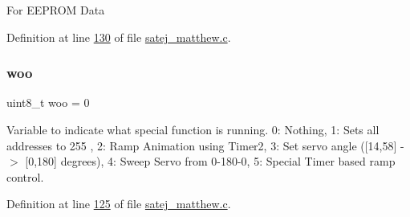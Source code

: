 For E\+E\+P\+R\+OM Data 

Definition at line \mbox{\hyperlink{satej__matthew_8c_source_l00130}{130}} of file \mbox{\hyperlink{satej__matthew_8c_source}{satej\+\_\+matthew.\+c}}.

\mbox{\label{satej__matthew_8c_a45597431413ee9d8b4226bad6151cdc0}} 
\subsubsection{\texorpdfstring{woo}{woo}}
{\footnotesize\ttfamily uint8\+\_\+t woo = 0}

Variable to indicate what special function is running. 0\+: Nothing, 1\+: Sets all addresses to 255 , 2\+: Ramp Animation using Timer2, 3\+: Set servo angle (\mbox{[}14,58\mbox{]} -\/$>$ \mbox{[}0,180\mbox{]} degrees), 4\+: Sweep Servo from 0-\/180-\/0, 5\+: Special Timer based ramp control. 

Definition at line \mbox{\hyperlink{satej__matthew_8c_source_l00125}{125}} of file \mbox{\hyperlink{satej__matthew_8c_source}{satej\+\_\+matthew.\+c}}.

